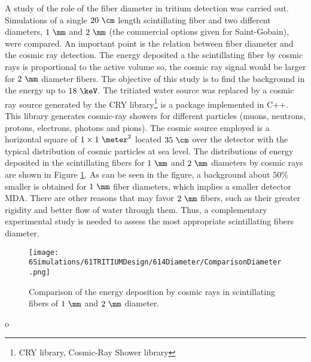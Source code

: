 A study of the role of the fiber diameter in tritium detection was carried out. Simulations of a single $20~\cm$ length scintillating fiber and two different diameters, $1~\mm$ and $2~\mm$ (the commercial options given for Saint-Gobain), were compared. An important point is the relation between fiber diameter and the cosmic ray detection. The energy deposited a the scintillating fiber by cosmic rays is proportional to the active volume so, the cosmic ray signal would be larger for $2~\mm$ diameter fibers. The objective of this study is to find the background in the energy up to $18~\keV$. The tritiated water source was replaced by a cosmic ray source generated by the CRY library\footnote{CRY library, Cosmic-Ray Shower library} \cite{CRYwebsite, CRYpaper} is a package implemented in C++. This library generates cosmic-ray showers for different particles (muons, neutrons, protons, electrons, photons and pions). The cosmic source employed is a horizontal square of $1 \times 1~\meter ^2$ located $35~\cm$ over the detector with the typical distribution of cosmic particles at sea level. The distributions of energy deposited in the scintillating fibers for $1~\mm$ and $2~\mm$ diameters by cosmic rays are shown in Figure \ref{fig:DiameterComparison}. As can be seen in the figure, a background about $50\%$ smaller is obtained for $1~\mm$ fiber diameters, which implies a smaller detector MDA. There are other reasons that may favor $2~\mm$ fibers, such as their greater rigidity and better flow of water through them. Thus, a complementary experimental study is needed to assess the most appropriate scintillating fibers diameter.

\begin{figure}[hbtp]
\centering
\texttt{[image: 6Simulations/61TRITIUMDesign/614Diameter/ComparisonDiameter.png]}
\caption{Comparison of the energy deposition by cosmic rays in scintillating fibers of $1~\mm$ and $2~\mm$ diameter.\label{fig:DiameterComparison}}
\end{figure}o